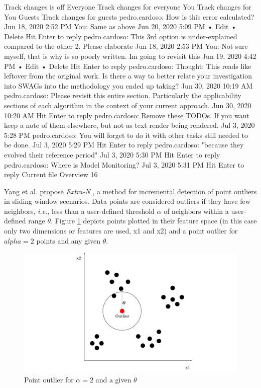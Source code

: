 Track changes is off
Everyone
Track changes for everyone
You
Track changes for You
Guests
Track changes for guests
pedro.cardoso: How is this error calculated?
Jun 18, 2020 2:52 PM
You: Same as above
Jun 20, 2020 5:09 PM • Edit • Delete
Hit Enter to reply
pedro.cardoso: This 3rd option is under-explained compared to the other 2. Please elaborate
Jun 18, 2020 2:53 PM
You: Not sure myself, that is why is so poorly written. Im going to revisit this
Jun 19, 2020 4:42 PM • Edit • Delete
Hit Enter to reply
pedro.cardoso: Thought: This reads like leftover from the original work. Is there a way to better relate your investigation into SWAGs into the methodology you ended up taking?
Jun 30, 2020 10:19 AM
pedro.cardoso: Please revisit this entire section. Particularly the applicability sections of each algorithm in the context of your current approach.
Jun 30, 2020 10:20 AM
Hit Enter to reply
pedro.cardoso: Remove these TODOs. If you want keep a note of them elsewhere, but not as text render being rendered.
Jul 3, 2020 5:28 PM
pedro.cardoso: You will forget to do it with other tasks still needed to be done.
Jul 3, 2020 5:29 PM
Hit Enter to reply
pedro.cardoso: "because they evolved their reference period"
Jul 3, 2020 5:30 PM
Hit Enter to reply
pedro.cardoso: Where is Model Monitoring?
Jul 3, 2020 5:31 PM
Hit Enter to reply
Current file
Overview
16

Yang et al. propose \emph{Extra-N} \cite{Yang-Neighbor-Based-Pattern-Detection}, a method for incremental detection of point outliers in sliding window scenarios. Data points are considered outliers if they have few neighbors, \textit{i.e.}, less than a user-defined threshold $\alpha$ of neighbors within a user-defined range $\theta$. Figure \ref{fig:point-outlier} depicts points plotted in their feature space (in this case only two dimensions or features are used, x1 and x2) and a point outlier for $alpha=2$ points and any given $\theta$.
\begin{figure}[!htb]
  \begin{center}
    \includegraphics[scale=0.6]{figures/point-outlier.pdf}
    \caption{Point outlier for $\alpha=2$ and a given $\theta$}
    \label{fig:point-outlier}
  \end{center}
\end{figure}

